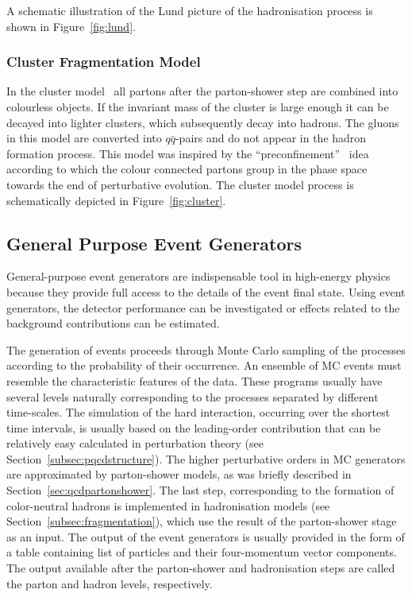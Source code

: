 A schematic illustration of the Lund picture of the hadronisation process is shown in Figure~\ref{fig:lund}.
\subsubsection{Cluster Fragmentation Model}
In the cluster model~\cite{Webber:1983if,Field:1982dg} all partons after the parton-shower step are combined into colourless objects. If the invariant mass of the cluster is large enough it can be decayed into lighter clusters, which subsequently decay into hadrons. The gluons in this model are converted into $q\bar{q}$-pairs and do not appear in the hadron formation process. This model was inspired by the ``preconfinement''~\cite{Amati:1979fg} idea according to which the colour connected partons group in the phase space towards the end of perturbative evolution. The cluster model process is schematically depicted in Figure~\ref{fig:cluster}.

\subsection{General Purpose Event Generators}
General-purpose event generators are indispensable tool in high-energy physics because they provide full access to the details of the event  final state. Using event generators, the detector performance can be investigated or effects related to the background contributions can be estimated.

The generation of events proceeds through Monte Carlo sampling of the processes according to the probability of their occurrence. An ensemble of MC events must resemble the characteristic features of the data. These programs usually have several levels naturally corresponding to the processes separated by different time-scales. The simulation of the hard interaction, occurring over the shortest time intervals, is usually based on the leading-order contribution that can be relatively easy calculated in perturbation theory (see Section~\ref{subsec:pqcdstructure}). The higher perturbative orders in MC generators are approximated by parton-shower models, as was briefly described in Section~\ref{sec:qcdpartonshower}. The last step, corresponding to the formation of color-neutral hadrons is implemented in hadronisation models (see Section~\ref{subsec:fragmentation}), which use the result of the parton-shower stage as an input. The output of the event generators is usually provided in the form of a table containing list of particles and their four-momentum vector components. The output available after the parton-shower and hadronisation steps are called the parton and hadron levels, respectively. 

